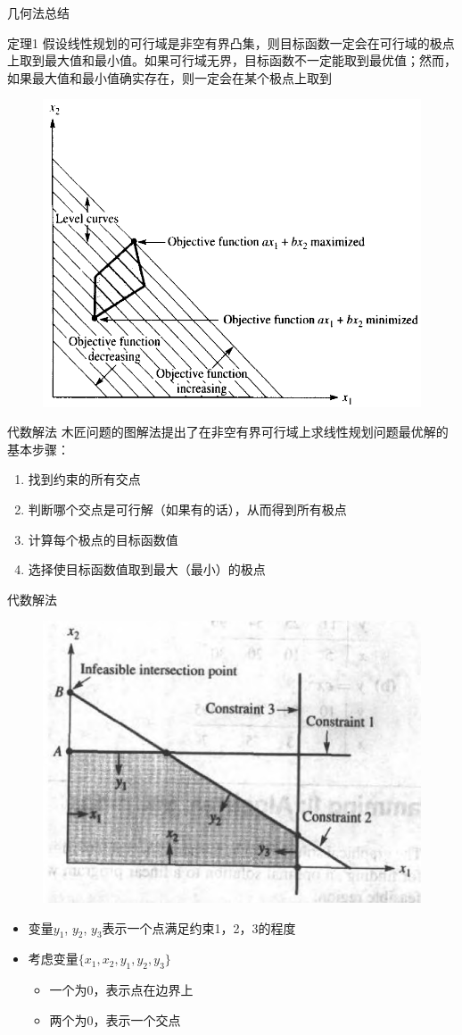 \documentclass[mathserif, table]{beamer}
\begin{document}
\begin{frame}{几何法总结}
  \begin{block}{定理1}
    假设线性规划的可行域是非空有界凸集，则目标函数一定会在可行域的极点上取到最大值和最小值。如果可行域无界，目标函数不一定能取到最优值；然而，如果最大值和最小值确实存在，则一定会在某个极点上取到
  \end{block}

  \begin{figure}
    \centering
    \includegraphics[width=.4\textwidth{}]{extreme.png}
  \end{figure}
\end{frame}

\begin{frame}{代数解法}
  木匠问题的图解法提出了在非空有界可行域上求线性规划问题最优解的基本步骤：
  \begin{enumerate}
  \item 找到约束的所有交点
  \item 判断哪个交点是可行解（如果有的话），从而得到所有极点
  \item 计算每个极点的目标函数值
  \item 选择使目标函数值取到最大（最小）的极点
  \end{enumerate}
  
\end{frame}

\begin{frame}{代数解法}
  \begin{figure}
    \centering
    \includegraphics[width=.6\textwidth{}]{inter.png}
  \end{figure}

  \begin{itemize}
  \item 变量$y_1$, $y_2$, $y_3$表示一个点满足约束1，2，3的程度
  \item 考虑变量$\{x_1, x_2, y_1, y_2, y_3\}$
    \begin{itemize}
    \item 一个为0，表示点在边界上
    \item 两个为0，表示一个交点
    \end{itemize}
  \end{itemize}
\end{frame}
\end{document}
